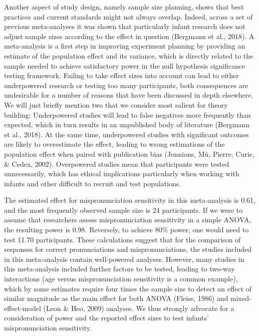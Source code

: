 \documentclass[man]{apa6}
\begin{document}
Another aspect of study design, namely sample size planning, shows that best practices and current standards might not always overlap. Indeed, across a set of previous meta-analyses it was shown that particularly infant research does not adjust sample sizes according to the effect in question (Bergmann et al., 2018). A meta-analysis is a first step in improving experiment planning by providing an estimate of the population effect and its variance, which is directly related to the sample needed to achieve satisfactory power in the null hypothesis significance testing framework. Failing to take effect sizes into account can lead to either underpowered research or testing too many participants, both consequences are undesirable for a number of reasons that have been discussed in depth elsewhere. We will just briefly mention two that we consider most salient for theory building: Underpowered studies will lead to false negatives more frequently than expected, which in turn results in an unpublished body of literature (Bergmann et al., 2018). At the same time, underpowered studies with significant outcomes are likely to overestimate the effect, leading to wrong estimations of the population effect when paired with publication bias (Jennions, Mù, Pierre, Curie, \& Cedex, 2002). Overpowered studies mean that participants were tested unnecessarily, which has ethical implications particularly when working with infants and other difficult to recruit and test populations.

The estimated effect for mispronunciation sensitivity in this meta-analysis is 0.61, and the most frequently observed sample size is 24 participants. If we were to assume that researchers assess mispronunciation sensitivity in a simple ANOVA, the resulting power is 0.98. Reversely, to achieve 80\% power, one would need to test 11.70 participants. These calculations suggest that for the comparison of responses for correct pronunciations and mispronunciations, the studies included in this meta-analysis contain well-powered analyses. However, many studies in this meta-analysis included further factors to be tested, leading to two-way interactions (age versus mispronunciation sensitivity is a common example), which by some estimates require four times the sample size to detect an effect of similar magnitude as the main effect for both ANOVA (Fleiss, 1986) and mixed-effect-model (Leon \& Heo, 2009) analyses. We thus strongly advocate for a consideration of power and the reported effect sizes to test infants' mispronunciation sensitivity.
\end{document}
